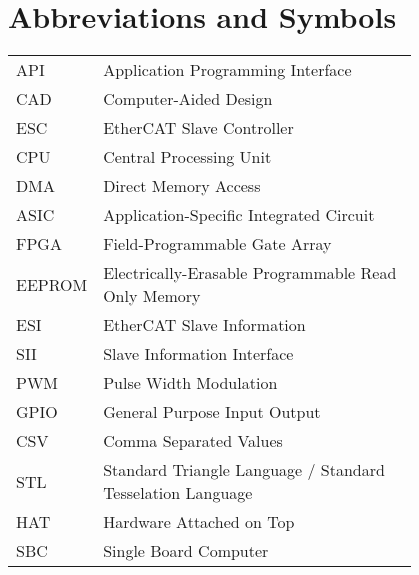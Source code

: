 \chapter*{Abbreviations and Symbols}

\begin{flushleft}
\begin{tabular}{l p{0.8\linewidth}}
API      & Application Programming Interface\\
CAD      & Computer-Aided Design\\
ESC      & EtherCAT Slave Controller\\
CPU      & Central Processing Unit\\
DMA      & Direct Memory Access\\
ASIC     & Application-Specific Integrated Circuit\\
FPGA     & Field-Programmable Gate Array\\
EEPROM   & Electrically-Erasable Programmable Read Only Memory\\
ESI      & EtherCAT Slave Information\\
SII      & Slave Information Interface\\
PWM      & Pulse Width Modulation\\
GPIO     & General Purpose Input Output\\
CSV      & Comma Separated Values\\
STL	 & Standard Triangle Language / Standard Tesselation Language\\
HAT	 & Hardware Attached on Top\\
SBC	& Single Board Computer\\
\end{tabular}
\end{flushleft}

